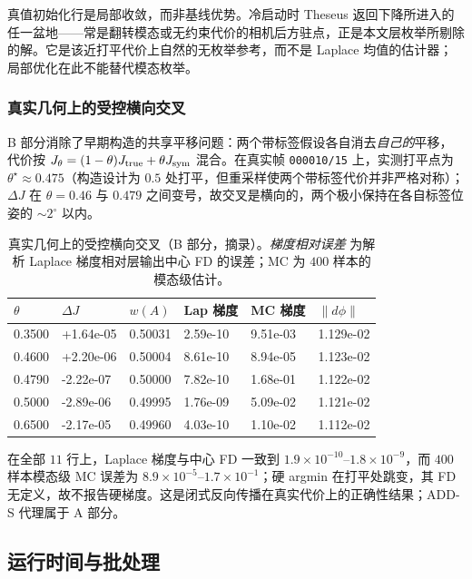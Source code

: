 真值初始化行是局部收敛，而非基线优势。冷启动时 Theseus 返回下降所进入的任一盆地——常是翻转模态或无约束代价的相机后方驻点，正是本文层枚举所剔除的解。它是该近打平代价上自然的无枚举参考，而不是 Laplace 均值的估计器；局部优化在此不能替代模态枚举。

\subsubsection{真实几何上的受控横向交叉}\label{sec:partb}

B 部分消除了早期构造的共享平移问题：两个带标签假设各自消去\emph{自己的}平移，代价按 $J_\theta=(1-\theta)J_{\rm true}+\theta J_{\rm sym}$ 混合。在真实帧 \texttt{000010/15} 上，实测打平点为 $\theta^\star\approx0.475$（构造设计为 $0.5$ 处打平，但重采样使两个带标签代价并非严格对称）；$\Delta J$ 在 $\theta=0.46$ 与 $0.479$ 之间变号，故交叉是横向的，两个极小保持在各自标签位姿的 $\sim2^\circ$ 以内。

\begin{table}[t]
\centering
\caption{真实几何上的受控横向交叉（B 部分，摘录）。\emph{梯度相对误差} 为解析 Laplace 梯度相对层输出中心 FD 的误差；MC 为 $400$ 样本的模态级估计。}
\label{tab:partb}
\scriptsize
\setlength{\tabcolsep}{2.5pt}
\begin{tabular}{@{}l l l l l l@{}}
\toprule
$\theta$ & $\Delta J$ & $w(A)$ & Lap 梯度 & MC 梯度 & $\|d\phi\|$\\
\midrule
0.3500 & +1.64e-05 & 0.50031 & 2.59e-10 & 9.51e-03 & 1.129e-02\\
0.4600 & +2.20e-06 & 0.50004 & 8.61e-10 & 8.94e-05 & 1.123e-02\\
0.4790 & -2.22e-07 & 0.50000 & 7.82e-10 & 1.68e-01 & 1.122e-02\\
0.5000 & -2.89e-06 & 0.49995 & 1.76e-09 & 5.09e-02 & 1.121e-02\\
0.6500 & -2.17e-05 & 0.49960 & 4.03e-10 & 1.10e-02 & 1.112e-02\\
\bottomrule
\end{tabular}
\end{table}

在全部 $11$ 行上，Laplace 梯度与中心 FD 一致到 $1.9\times10^{-10}$--$1.8\times10^{-9}$，而 $400$ 样本模态级 MC 误差为 $8.9\times10^{-5}$--$1.7\times10^{-1}$；硬 argmin 在打平处跳变，其 FD 无定义，故不报告硬梯度。这是闭式反向传播在真实代价上的正确性结果；ADD-S 代理属于 A 部分。

\subsection{运行时间与批处理}\label{sec:compute}


